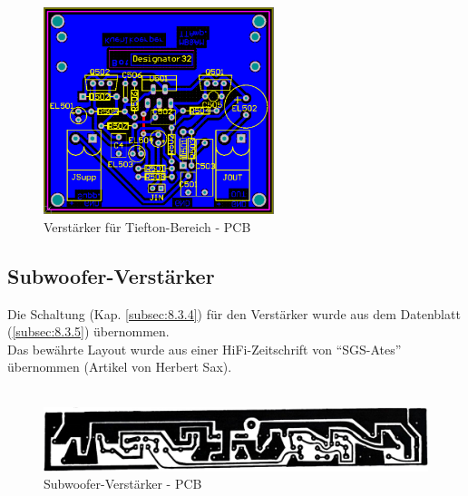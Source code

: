 \begin{figure} [H]
	\centering	
	\includegraphics[width=0.6\textwidth]{img/Print5/5_TTVerstaerker-PCB.PNG}
	\caption{Verstärker für Tiefton-Bereich - PCB}
	\label {fig:5.2.3.1}
\end{figure}


\newpage
\subsection{Subwoofer-Verstärker}
Die Schaltung (Kap. \ref{subsec:8.3.4}) für den Verstärker wurde aus dem Datenblatt (\ref{subsec:8.3.5}) übernommen.\\
Das bewährte Layout wurde aus einer HiFi-Zeitschrift von \enquote{SGS-Ates} übernommen (Artikel von Herbert Sax).
\\ \\

\begin{figure} [H]
	\centering	
	\includegraphics[width=1\textwidth]{img/SubwooferAmpLayout.PNG}
	\caption{Subwoofer-Verstärker - PCB}
	\label {fig:5.2.3.2}
\end{figure}